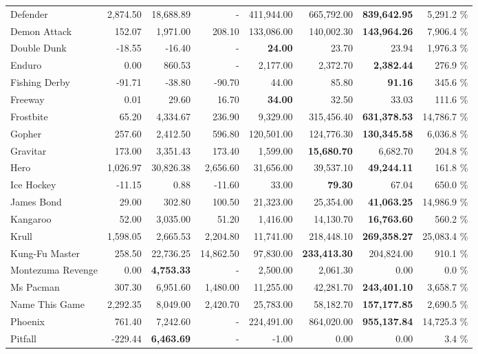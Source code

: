 \documentclass{article}
\begin{document}
\begin{table}
\begin{center}
\begin{tabularx}{0.900000\textwidth}{X| r r r r r r r}
Defender&2,874.50 & 18,688.89 & - & 411,944.00 & 665,792.00 & \textbf{839,642.95} & 5,291.2 \%\\
Demon Attack&152.07 & 1,971.00 & 208.10 & 133,086.00 & 140,002.30 & \textbf{143,964.26} & 7,906.4 \%\\
Double Dunk&-18.55 & -16.40 & - & \textbf{24.00} & 23.70 & 23.94 & 1,976.3 \%\\
Enduro&0.00 & 860.53 & - & 2,177.00 & 2,372.70 & \textbf{2,382.44} & 276.9 \%\\
Fishing Derby&-91.71 & -38.80 & -90.70 & 44.00 & 85.80 & \textbf{91.16} & 345.6 \%\\
Freeway&0.01 & 29.60 & 16.70 & \textbf{34.00} & 32.50 & 33.03 & 111.6 \%\\
Frostbite&65.20 & 4,334.67 & 236.90 & 9,329.00 & 315,456.40 & \textbf{631,378.53} & 14,786.7 \%\\
Gopher&257.60 & 2,412.50 & 596.80 & 120,501.00 & 124,776.30 & \textbf{130,345.58} & 6,036.8 \%\\
Gravitar&173.00 & 3,351.43 & 173.40 & 1,599.00 & \textbf{15,680.70} & 6,682.70 & 204.8 \%\\
Hero&1,026.97 & 30,826.38 & 2,656.60 & 31,656.00 & 39,537.10 & \textbf{49,244.11} & 161.8 \%\\
Ice Hockey&-11.15 & 0.88 & -11.60 & 33.00 & \textbf{79.30} & 67.04 & 650.0 \%\\
James Bond&29.00 & 302.80 & 100.50 & 21,323.00 & 25,354.00 & \textbf{41,063.25} & 14,986.9 \%\\
Kangaroo&52.00 & 3,035.00 & 51.20 & 1,416.00 & 14,130.70 & \textbf{16,763.60} & 560.2 \%\\
Krull&1,598.05 & 2,665.53 & 2,204.80 & 11,741.00 & 218,448.10 & \textbf{269,358.27} & 25,083.4 \%\\
Kung-Fu Master&258.50 & 22,736.25 & 14,862.50 & 97,830.00 & \textbf{233,413.30} & 204,824.00 & 910.1 \%\\
Montezuma Revenge&0.00 & \textbf{4,753.33} & - & 2,500.00 & 2,061.30 & 0.00 & 0.0 \%\\
Ms Pacman&307.30 & 6,951.60 & 1,480.00 & 11,255.00 & 42,281.70 & \textbf{243,401.10} & 3,658.7 \%\\
Name This Game&2,292.35 & 8,049.00 & 2,420.70 & 25,783.00 & 58,182.70 & \textbf{157,177.85} & 2,690.5 \%\\
Phoenix&761.40 & 7,242.60 & - & 224,491.00 & 864,020.00 & \textbf{955,137.84} & 14,725.3 \%\\
Pitfall&-229.44 & \textbf{6,463.69} & - & -1.00 & 0.00 & 0.00 & 3.4 \%\\

\end{tabularx}
\end{center}
\end{table}
\end{document}
